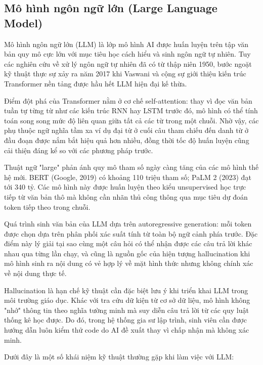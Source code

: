 \documentclass[../main.tex]{subfiles}
\begin{document}
\subsection{Mô hình ngôn ngữ lớn (Large Language Model)}

Mô hình ngôn ngữ lớn (LLM) là lớp mô hình AI được huấn luyện trên tập văn bản quy mô cực lớn với mục tiêu học cách hiểu và sinh ngôn ngữ tự nhiên. Tuy các nghiên cứu về xử lý ngôn ngữ tự nhiên đã có từ thập niên 1950, bước ngoặt kỹ thuật thực sự xảy ra năm 2017 khi Vaswani và cộng sự giới thiệu kiến trúc Transformer nền tảng được hầu hết LLM hiện đại kế thừa.

Điểm đột phá của Transformer nằm ở cơ chế self-attention: thay vì đọc văn bản tuần tự từng từ như các kiến trúc RNN hay LSTM trước đó, mô hình có thể tính toán song song mức độ liên quan giữa tất cả các từ trong một chuỗi. Nhờ vậy, các phụ thuộc ngữ nghĩa tầm xa ví dụ đại từ ở cuối câu tham chiếu đến danh từ ở đầu đoạn được nắm bắt hiệu quả hơn nhiều, đồng thời tốc độ huấn luyện cũng cải thiện đáng kể so với các phương pháp trước.

Thuật ngữ "large" phản ánh quy mô tham số ngày càng tăng của các mô hình thế hệ mới. BERT (Google, 2019) có khoảng 110 triệu tham số; PaLM 2 (2023) đạt tới 340 tỷ. Các mô hình này được huấn luyện theo kiểu unsupervised học trực tiếp từ văn bản thô mà không cần nhãn thủ công thông qua mục tiêu dự đoán token tiếp theo trong chuỗi.

Quá trình sinh văn bản của LLM dựa trên autoregressive generation: mỗi token được chọn dựa trên phân phối xác suất tính từ toàn bộ ngữ cảnh phía trước. Đặc điểm này lý giải tại sao cùng một câu hỏi có thể nhận được các câu trả lời khác nhau qua từng lần chạy, và cũng là nguồn gốc của hiện tượng hallucination khi mô hình sinh ra nội dung có vẻ hợp lý về mặt hình thức nhưng không chính xác về nội dung thực tế.

Hallucination là hạn chế kỹ thuật cần đặc biệt lưu ý khi triển khai LLM trong môi trường giáo dục. Khác với tra cứu dữ kiện từ cơ sở dữ liệu, mô hình không "nhớ" thông tin theo nghĩa tường minh mà suy diễn câu trả lời từ các quy luật thống kê học được. Do đó, trong hệ thống gia sư lập trình, sinh viên cần được hướng dẫn luôn kiểm thử code do AI đề xuất thay vì chấp nhận mà không xác minh.

Dưới đây là một số khái niệm kỹ thuật thường gặp khi làm việc với LLM:
\end{document}

